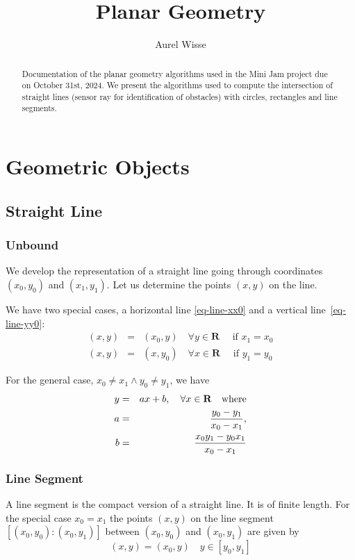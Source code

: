 \documentclass[11pt]{article}
\newcommand{\Rb}{{\mathbf{R}}}
\begin{document}
%
%
\title{Planar Geometry}
\author{Aurel Wisse}
\maketitle
%
%
\begin{abstract}
Documentation of the planar geometry algorithms used in the
Mini Jam project due on October 31st, 2024. We present the algorithms used to
compute the intersection of straight lines (sensor ray for identification
of obstacles) with circles, rectangles and line segments.
\end{abstract}
%
\pagebreak
\tableofcontents
\listoftables
\listoffigures
\pagebreak
%
\section{Geometric Objects}
\label{sec-geometric-objects}
\subsection{Straight Line}
\label{sec-straight-line}

\subsubsection{Unbound}
\label{sec:unbound}
We develop the representation of a straight line going through
coordinates $(x_0, y_0)$ and $(x_1, y_1)$. Let us determine the points $(x,
y)$ on the line.

We have two special cases, a horizontal line \eqref{eq-line-xx0} and a
vertical line~\eqref{eq-line-yy0}:
\begin{eqnarray}
    (x, y) &=& (x_0, y)\quad\forall y\in\Rb\quad \text{ if } x_1 = x_0
    \label{eq-line-xx0} \\
    (x, y) &=& (x, y_0)\quad\forall x\in\Rb\quad \text{ if } y_1 = y_0
    \label{eq-line-yy0}
\end{eqnarray}

For the general case, $x_0 \neq x_1 \land y_0 \neq y_1$, we have
\begin{eqnarray}
    y &=& ax+b,\quad \forall x\in\Rb\quad \text{where}\label{eq-line-general}\\
    a &=& \frac{y_0 - y_1}{x_0 - x_1}, \notag \\
    b &=& \frac{x_0 y_1 - y_0 x_1}{x_0 - x_1} \notag
\end{eqnarray}

\subsubsection{Line Segment}
\label{sec-line-segment}
A line segment is the compact version of a straight line. It is of finite
length. For the special case $x_0 = x_1$ the points $(x, y)$ on the line
segment $[(x_0, y_0):(x_0, y_1)]$ between $(x_0, y_0)$ and $(x_0, y_1)$ are
given by
\begin{equation}
    (x, y) = (x_0, y)\quad y\in [y_0, y_1]\label{eq-seg-x1x0}
\end{equation}
\end{document}
